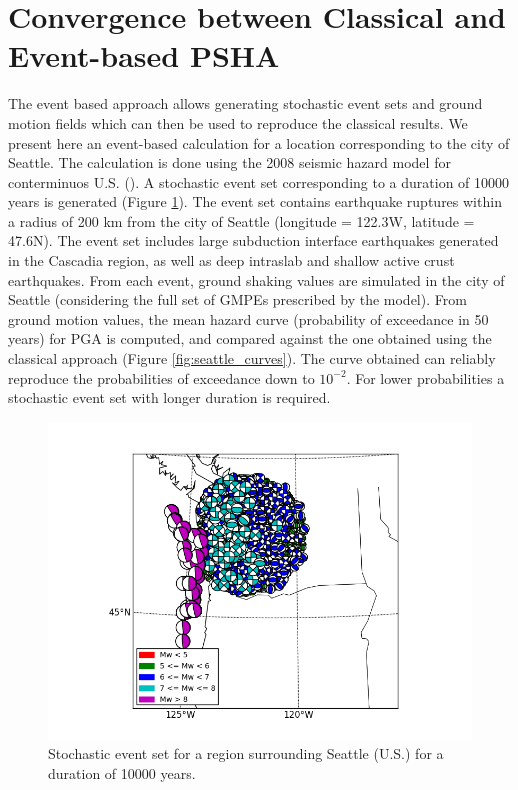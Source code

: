 \section{Convergence between Classical and Event-based PSHA}
The event based approach allows generating stochastic event sets and ground motion fields which can then
be used to reproduce the classical results. We present here an event-based calculation for a location corresponding to the city of Seattle. The calculation is done using the 2008 seismic hazard model for conterminuos U.S. (\cite{petersen2008}). A stochastic event set corresponding to a duration of 10000
years is generated (Figure \ref{fig:seattle_ses}). The event set contains earthquake ruptures within a radius of
200 km from the city of Seattle (longitude = 122.3W, latitude = 47.6N). The event set includes large subduction interface earthquakes generated in the Cascadia region, as well as deep intraslab and shallow active crust earthquakes. From each event, ground shaking values are simulated in the city of Seattle (considering the full set of GMPEs prescribed by the model). From ground motion values, the mean
hazard curve (probability of exceedance in 50 years) for PGA is computed, and compared against the
one obtained using the classical approach (Figure \ref{fig:seattle_curves}). The curve obtained can reliably
reproduce the probabilities of exceedance down to $10^{-2}$. For lower probabilities a stochastic event
set with longer duration is required.
\begin{figure}
\centering
\includegraphics[width=14cm]{./Pictures/ses_USA_NSHMP2008.png}
\caption{Stochastic event set for a region surrounding Seattle (U.S.) for a duration of 10000 years.}
\label{fig:seattle_ses}
\end{figure}
